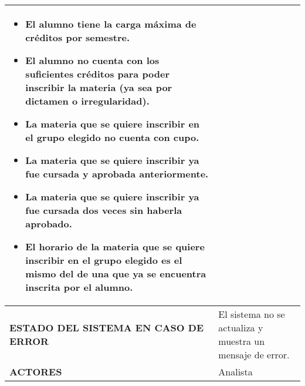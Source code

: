 \begin{longtable}{ | p{6cm} | p{10cm} |}
\begin{itemize}
    \item El alumno tiene la carga máxima de créditos por semestre.
    \item El alumno no cuenta con los suficientes créditos para poder inscribir la materia (ya sea por dictamen o irregularidad).
    \item La materia que se quiere inscribir en el grupo elegido no cuenta con cupo.
    \item La materia que se quiere inscribir ya fue cursada y aprobada anteriormente.
    \item La materia que se quiere inscribir ya fue cursada dos veces sin haberla aprobado.
    \item El horario de la materia que se quiere inscribir en el grupo elegido es el mismo del de una que ya se encuentra inscrita por el alumno.
\end{itemize}\\
\hline
\textbf{ESTADO DEL SISTEMA EN CASO DE ERROR} & El sistema no se actualiza y muestra un mensaje de error.\\
\hline
\textbf{ACTORES} & Analista\\
\hline
\end{longtable}
\newpage
